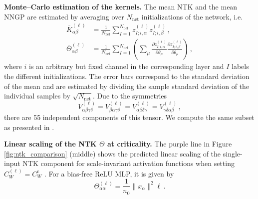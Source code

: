 
\textbf{Monte--Carlo estimation of the kernels.} The mean NTK and the mean NNGP are estimated by averaging over $N_\text{net}$ initializations of the network, i.e.\
\begin{align}
  \overline{K}^{(\ell)}_{\alpha \beta} &= \frac{1}{N_\text{net}} \sum_{I=1}^{N_\text{net}} z^{(\ell)}_{I;i,\alpha} z^{(\ell)}_{I;i,\beta} \,, \label{eq:nngp_mc}\\
\overline{\Theta}^{(\ell)}_{\alpha \beta} &= \frac{1}{N_\text{net}} \sum_{I=1}^{N_\text{net}} \left( \sum_{\mu}\frac{\partial z^{(\ell)}_{I;i,\alpha}}{\partial\theta_{\mu}}\frac{\partial z^{(\ell)}_{I; i, \beta}}{\partial\theta_{\mu}}\right) \,,
\end{align}
where $i$ is an arbitrary but fixed channel in the corresponding layer and $I$ labels the different initializations. The error bars correspond to the standard deviation of the mean and are estimated by dividing the sample standard deviation of the individual samples by $\sqrt{N_\text{net}}$. Due to the symmetries
\begin{equation}
  V^{(\ell)}_{\alpha \beta \gamma \delta} = V^{(\ell)}_{\beta \alpha \gamma \delta} = V^{(\ell)}_{\alpha \beta \delta \gamma} = V^{(\ell)}_{\gamma \delta \alpha \beta} \, ,
  \label{eq:v4_symmetries}
\end{equation}
there are 55 independent components of this tensor. We compute the same subset as presented in \cite{banta2024}.


\textbf{Linear scaling of the NTK $\Theta$ at criticality.} The purple line in Figure \ref{fig:ntk_comparison} (middle) shows the predicted linear scaling of the single-input NTK component for scale-invariant activation functions when setting $C_W^{(\ell)} = C_W^\mathrm{c}$ \cite{roberts2022}. For a bias-free ReLU MLP, it is given by
\begin{equation}
  \Theta^{(\ell)}_{\alpha \alpha} = \frac{1}{n_0} \|x_\alpha\|^2  \ell \,.
\end{equation}

